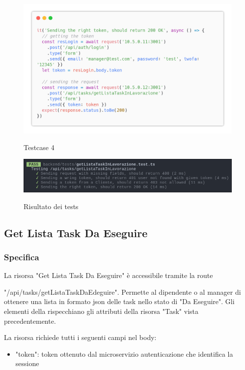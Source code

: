 \documentclass{report}
\begin{document}
\begin{figure}[H]
	\centering\includegraphics[width=1\textwidth]{images/code_in_lavorazione_test4.png}
	
	Testcase 4
\end{figure}

\begin{figure}[H]
	\centering\includegraphics[width=1\textwidth]{images/jest_in_lavorazione.png}
	
    Risultato dei tests
\end{figure}

\subsection{Get Lista Task Da Eseguire}
\subsubsection*{Specifica}

La risorsa "Get Lista Task Da Eseguire" è accessibile tramite la route

"/api/tasks/getListaTaskDaEdeguire". Permette al dipendente o al manager di ottenere una lista in formato json delle task nello stato di "Da Eseguire". Gli elementi della rispecchiano gli attributi della risorsa "Task" vista precedentemente.

La risorsa richiede tutti i seguenti campi nel body:
\begin{itemize}
	\item "token": token ottenuto dal microservizio autenticazione che identifica la sessione
\end{itemize}
\end{document}
